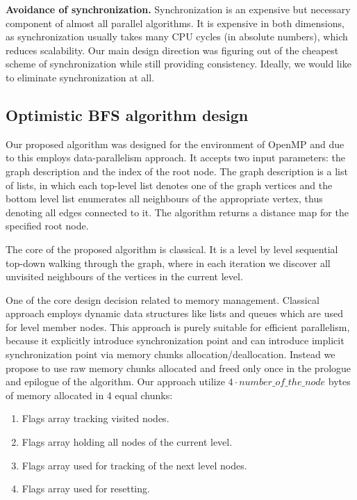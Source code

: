 \documentclass[letterpaper]{article}
\begin{document}
			\textbf{Avoidance of synchronization.}
			Synchronization is an expensive but necessary component of almost all parallel algorithms.
			It is expensive in both dimensions, as synchronization usually takes many CPU cycles (in absolute numbers), which reduces scalability. 	%
			Our main design direction was figuring out of the cheapest scheme of synchronization while still providing consistency.
			Ideally, we would like to eliminate synchronization at all.
			
		\subsection{Optimistic BFS algorithm design}
			Our proposed algorithm was designed for the environment of OpenMP and due to this employs data-parallelism approach. 
			It accepts two input parameters: the graph description and the index of the root node.
			The graph description is a list of lists, in which each top-level list denotes one of the graph vertices and the bottom level list enumerates all neighbours of the appropriate vertex, thus denoting all edges connected to it.
			The algorithm returns a distance map for the specified root node.
			
			The core of the proposed algorithm is classical. 
			It is a level by level sequential top-down walking through the graph, where in each iteration we discover all unvisited neighbours of the vertices in the current level.
			
			One of the core design decision related to memory management.
			Classical approach employs dynamic data structures like lists and queues which are used for level member nodes.
			This approach is purely suitable for efficient parallelism, because it explicitly introduce synchronization point and can introduce implicit synchronization point via memory chunks allocation/deallocation. 
			Instead we propose to use raw memory chunks allocated and freed only once in the prologue and epilogue of the algorithm.
			Our approach utilize $4 \cdot number\_of\_the\_node$ bytes of memory allocated in 4 equal chunks:
			\begin{enumerate}
				\item Flags array tracking visited nodes.
				\item Flags array holding all nodes of the current level.
				\item Flags array used for tracking of the next level nodes.
				\item Flags array used for resetting.
			\end{enumerate}
			
\end{document}
